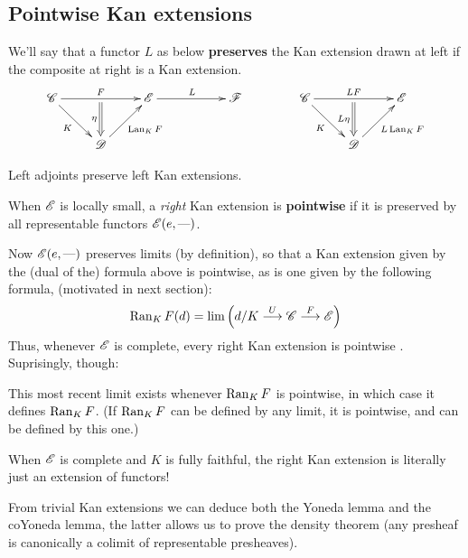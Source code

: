 \documentclass[11pt]{article}
\begin{document}
\begin{2. Kan Extensions}
\subsection*{Pointwise Kan extensions}
We'll say that a functor $L$ as below \textbf{preserves} the Kan extension drawn at left if the composite at right is a Kan extension.
\[
\vcenter{\xymatrix{
\scrC\ar[rd]_-{K}\ar[rr]^-{F}_-{}="arF"&%
&%
\scrE\ar[rr]^L&&\scrF\\%
&%
\scrD\ar@{->}[ur]_{\Lan_KF}\ar@{=>}"arF";[]_-{\eta}&%
}}
\qquad \qquad 
\vcenter{\xymatrix{
\scrC\ar[rd]_-{K}
\ar[rr]^-{LF}_-{}="arF"&%
&%
\scrE\\%
&%
\scrD\ar@{->}[ur]_{L\Lan_KF}
\ar@{=>}"arF";[]_-{L\eta}&%
}}
\]
\begin{lem*}
Left adjoints preserve left Kan extensions.
\end{lem*}
\begin{defn*}
When $\mathscr{E}$ is locally small, a \textit{right} Kan extension is \textbf{pointwise} if it is preserved by all representable functors $\mathscr{E}(e,\textup{---} )$.
\end{defn*}
Now $\mathscr{E}(e,\textup{---} )$ preserves limits (by definition), so that a Kan extension given by the (dual of the) formula above is pointwise, as is one given by the following formula, (motivated in next section):
\[\operatorname{Ran}_KF(d)=\lim\left(d/K\overset{U}{\longrightarrow}\mathscr{C}\overset{F}{\longrightarrow}\mathscr{E}\right)\]
Thus, whenever $\mathscr{E}$ is complete, every right Kan extension is pointwise .
Suprisingly, though:
\begin{thm*}
This most recent limit exists whenever $\operatorname{Ran}_KF$ is pointwise, in which case it defines $\operatorname{Ran}_KF$. (If $\operatorname{Ran}_KF$ can be defined by any limit, it is pointwise, and can be defined by this one.)
\end{thm*}
\begin{thm*}
When $\mathscr{E}$ is complete and $K$ is fully faithful, the right Kan extension is literally just an extension of functors!
\end{thm*}
From trivial Kan extensions we can deduce both the Yoneda lemma and the coYoneda lemma, the latter allows us to prove the density theorem (any presheaf is canonically a colimit of representable presheaves).

\end{2. Kan Extensions}
\end{document}
